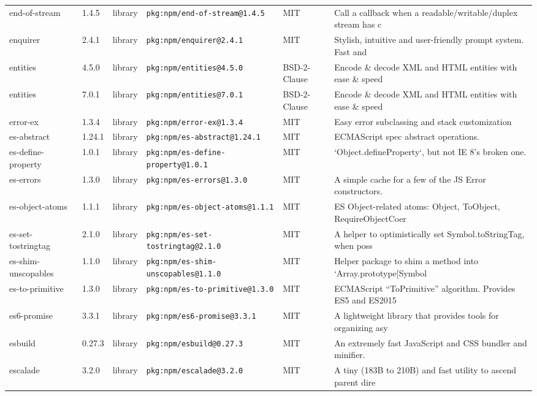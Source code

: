 \documentclass[11pt]{article}
\begin{document}
\begin{longtable}{|l|l|l|p{2.2cm}|l|p{4cm}|}
end-of-stream & 1.4.5 & library & \texttt{pkg:npm/end-of-stream@1.4.5} & MIT & Call a callback when a readable/writable/duplex stream has c \\
enquirer & 2.4.1 & library & \texttt{pkg:npm/enquirer@2.4.1} & MIT & Stylish, intuitive and user-friendly prompt system. Fast and \\
entities & 4.5.0 & library & \texttt{pkg:npm/entities@4.5.0} & BSD-2-Clause & Encode \& decode XML and HTML entities with ease \& speed \\
entities & 7.0.1 & library & \texttt{pkg:npm/entities@7.0.1} & BSD-2-Clause & Encode \& decode XML and HTML entities with ease \& speed \\
error-ex & 1.3.4 & library & \texttt{pkg:npm/error-ex@1.3.4} & MIT & Easy error subclassing and stack customization \\
es-abstract & 1.24.1 & library & \texttt{pkg:npm/es-abstract@1.24.1} & MIT & ECMAScript spec abstract operations. \\
es-define-property & 1.0.1 & library & \texttt{pkg:npm/es-define-property@1.0.1} & MIT & `Object.defineProperty`, but not IE 8's broken one. \\
es-errors & 1.3.0 & library & \texttt{pkg:npm/es-errors@1.3.0} & MIT & A simple cache for a few of the JS Error constructors. \\
es-object-atoms & 1.1.1 & library & \texttt{pkg:npm/es-object-atoms@1.1.1} & MIT & ES Object-related atoms: Object, ToObject, RequireObjectCoer \\
es-set-tostringtag & 2.1.0 & library & \texttt{pkg:npm/es-set-tostringtag@2.1.0} & MIT & A helper to optimistically set Symbol.toStringTag, when poss \\
es-shim-unscopables & 1.1.0 & library & \texttt{pkg:npm/es-shim-unscopables@1.1.0} & MIT & Helper package to shim a method into `Array.prototype[Symbol \\
es-to-primitive & 1.3.0 & library & \texttt{pkg:npm/es-to-primitive@1.3.0} & MIT & ECMAScript “ToPrimitive” algorithm. Provides ES5 and ES2015  \\
es6-promise & 3.3.1 & library & \texttt{pkg:npm/es6-promise@3.3.1} & MIT & A lightweight library that provides tools for organizing asy \\
esbuild & 0.27.3 & library & \texttt{pkg:npm/esbuild@0.27.3} & MIT & An extremely fast JavaScript and CSS bundler and minifier. \\
escalade & 3.2.0 & library & \texttt{pkg:npm/escalade@3.2.0} & MIT & A tiny (183B to 210B) and fast utility to ascend parent dire \\

\end{longtable}
\end{document}

